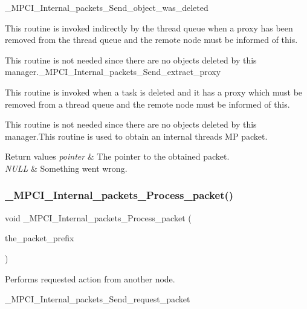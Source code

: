 \+\_\+\+M\+P\+C\+I\+\_\+\+Internal\+\_\+packets\+\_\+\+Send\+\_\+object\+\_\+was\+\_\+deleted

This routine is invoked indirectly by the thread queue when a proxy has been removed from the thread queue and the remote node must be informed of this.

This routine is not needed since there are no objects deleted by this manager.\+\_\+\+M\+P\+C\+I\+\_\+\+Internal\+\_\+packets\+\_\+\+Send\+\_\+extract\+\_\+proxy

This routine is invoked when a task is deleted and it has a proxy which must be removed from a thread queue and the remote node must be informed of this.

This routine is not needed since there are no objects deleted by this manager.\+This routine is used to obtain an internal threads MP packet.


\begin{DoxyRetVals}{Return values}
{\em pointer} & The pointer to the obtained packet. \\
\hline
{\em N\+U\+LL} & Something went wrong. \\
\hline
\end{DoxyRetVals}
\mbox{\label{group__RTEMSScoreMPCI_gae202814c7151db9baf145786aa4ef068}} 
\subsubsection{\texorpdfstring{\_MPCI\_Internal\_packets\_Process\_packet()}{\_MPCI\_Internal\_packets\_Process\_packet()}}
{\footnotesize\ttfamily void \+\_\+\+M\+P\+C\+I\+\_\+\+Internal\+\_\+packets\+\_\+\+Process\+\_\+packet (\begin{DoxyParamCaption}\item[{\mbox{\hyperlink{structMP__packet__Prefix}{M\+P\+\_\+packet\+\_\+\+Prefix}} $\ast$}]{the\+\_\+packet\+\_\+prefix }\end{DoxyParamCaption})}



Performs requested action from another node. 

\+\_\+\+M\+P\+C\+I\+\_\+\+Internal\+\_\+packets\+\_\+\+Send\+\_\+request\+\_\+packet

